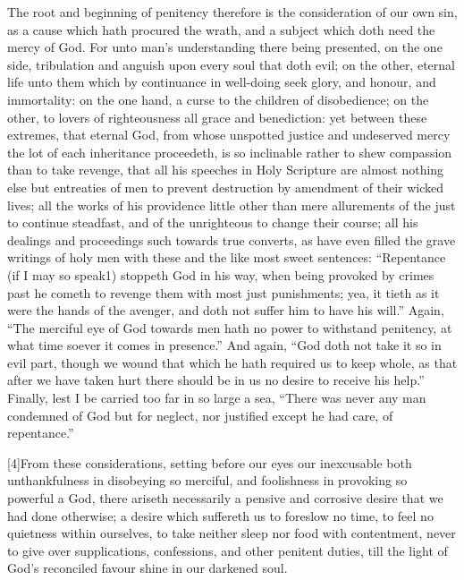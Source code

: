 The root and beginning of penitency therefore is the consideration of our own sin, as a cause which hath procured the wrath, and a subject which doth need the mercy of God. For unto man’s understanding there being presented, on the one side, tribulation and anguish upon every soul that doth evil; on the other, eternal life unto them which by continuance in well-doing seek glory, and honour, and immortality: on the one hand, a curse to the children of disobedience; on the other, to lovers of righteousness all grace and benediction: yet between these extremes, that eternal God, from whose unspotted justice and undeserved mercy the lot of each inheritance proceedeth, is so inclinable rather to shew compassion than to take revenge, that all his speeches in Holy Scripture are almost nothing else but entreaties of men to prevent destruction by amendment of their wicked lives; all the works of his providence little other than mere allurements of the just to continue steadfast, and of the unrighteous to change their course; all his dealings and proceedings such towards true converts, as have even filled the grave writings of holy men with these and the like most sweet sentences: “Repentance (if I may so speak1) stoppeth God in his way, when being provoked by crimes past he cometh to revenge them with most just punishments; yea, it tieth as it were the hands of the avenger, and doth not suffer him to have his will.” Again, “The merciful eye of God towards men hath no power to withstand penitency, at what time soever it comes in presence.” And again, “God doth not take it so in evil part, though we wound that which he hath required us to keep whole, as that after we have taken hurt there should be in us no desire to receive his help.” Finally, lest I be carried too far in so large a sea, “There was never any man condemned of God but for neglect, nor justified except he had care, of repentance.”

[4]From these considerations, setting before our eyes our inexcusable both unthankfulness in disobeying so merciful, and foolishness in provoking so powerful a God, there ariseth necessarily a pensive and corrosive desire that we had done otherwise; a desire which suffereth us to foreslow no time, to feel no quietness within ourselves, to take neither sleep nor food with contentment, never to give over supplications, confessions, and other penitent duties, till the light of God’s reconciled favour shine in our darkened soul.


